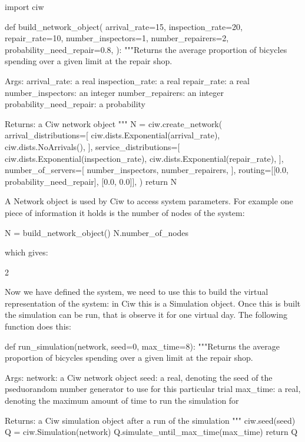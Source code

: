 \begin{pyin}
import ciw

def build_network_object(
    arrival_rate=15,
    inspection_rate=20,
    repair_rate=10,
    number_inspectors=1,
    number_repairers=2,
    probability_need_repair=0.8,
):
    """Returns the average proportion of bicycles spending over
    a given limit at the repair shop.
    
    Args:
        arrival_rate: a real
        inspection_rate: a real
        repair_rate: a real
        number_inspectors: an integer
        number_repairers: an integer
        probability_need_repair: a probability
    
    Returns:
        a Ciw network object
    """
    N = ciw.create_network(
        arrival_distributions=[
            ciw.dists.Exponential(arrival_rate),
            ciw.dists.NoArrivals(),
        ],
        service_distributions=[
            ciw.dists.Exponential(inspection_rate),
            ciw.dists.Exponential(repair_rate),
        ],
        number_of_servers=[
            number_inspectors,
            number_repairers,
        ],
        routing=[[0.0, probability_need_repair], [0.0, 0.0]],
    )
    return N
\end{pyin}

A Network object is used by Ciw to access system parameters. For example one
piece of information it holds is the number of nodes of the system:

\begin{pyin}
N = build_network_object()
N.number_of_nodes
\end{pyin}

which gives:

\begin{pyout}
2
\end{pyout}

Now we have defined the system, we need to use this to build the virtual
representation of the system: in Ciw this is a Simulation object.
Once this is built the simulation can be run, that is observe it for one
virtual day. The following function does this:

\begin{pyin}
def run_simulation(network, seed=0, max_time=8):
    """Returns the average proportion of bicycles spending over
    a given limit at the repair shop.
    
    Args:
        network: a Ciw network object
        seed: a real, denoting the seed of the pseduorandom
              number generator to use for this particular trial
        max_time: a real, denoting the maximum amount of time
                  to run the simulation for

    Returns:
        a Ciw simulation object after a run of the simulation
    """
    ciw.seed(seed)
    Q = ciw.Simulation(network)
    Q.simulate_until_max_time(max_time)
    return Q
\end{pyin}

